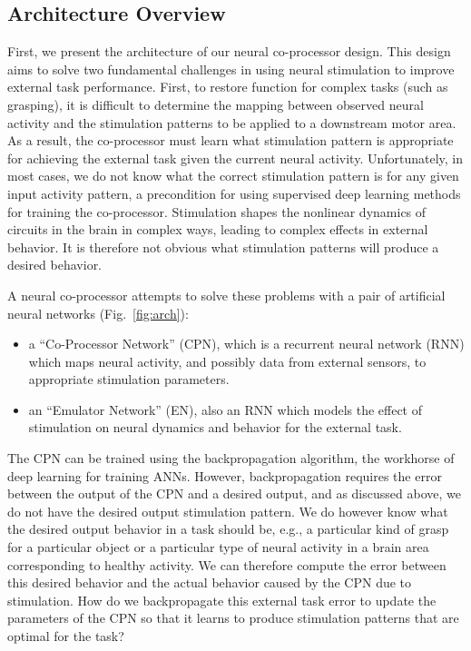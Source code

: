 \documentclass[12pt]{iopart}
\begin{document}
\subsection{Architecture Overview}
First, we present the architecture of our neural co-processor design. This design aims to solve two
fundamental challenges in using neural stimulation to improve external task performance.
First, to restore function for complex tasks (such as grasping), it is difficult to determine
the mapping between observed neural activity and the stimulation patterns to be applied to a downstream
motor area. As a result, the co-processor must learn what stimulation pattern is appropriate for achieving the
external task given the current neural activity. Unfortunately, in most cases, we do not know what the correct
stimulation pattern is for any given input activity pattern, a precondition for using supervised deep learning
methods for training the co-processor. Stimulation shapes the nonlinear dynamics of circuits in the brain
in complex ways, leading to complex effects in external behavior. It is therefore not obvious what
stimulation patterns will produce a desired behavior. 

A neural co-processor attempts to solve these problems with a pair of artificial neural networks 
(Fig.~\ref{fig:arch}):
\begin{itemize}
    \item a ``Co-Processor Network'' (CPN), which is a recurrent neural network (RNN) which maps neural activity, and possibly
	      data from external sensors, to appropriate stimulation parameters.
    \item an ``Emulator Network'' (EN), also an RNN which models the effect of stimulation on neural dynamics and
          behavior for the external task.
\end{itemize}

The CPN can be trained using the backpropagation algorithm, the workhorse of deep learning for training ANNs.
However, backpropagation requires the error between the output of the CPN and a desired output, and as
discussed above, we do not have the desired output stimulation pattern. We do however know what the desired
output behavior in a task should be, e.g., a particular kind of grasp for a particular object or a particular
type of neural activity in a brain area corresponding to healthy activity. We can therefore compute the error
between this desired behavior and the actual behavior caused by the CPN due to stimulation. How do we
backpropagate this external task error to update the parameters of the CPN so that it learns to produce
stimulation patterns that are optimal for the task?
\end{document}
